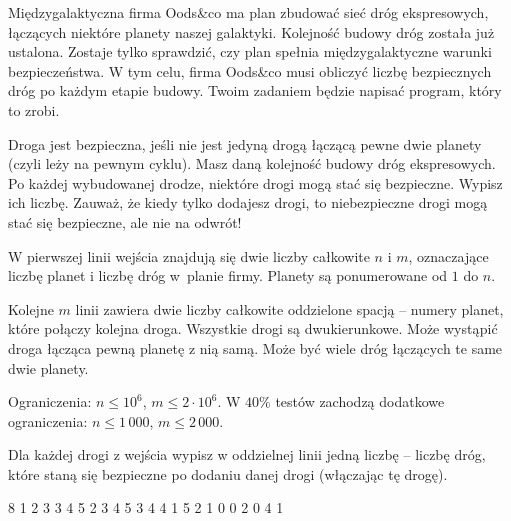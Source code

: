 

\usepackage[utf8]{inputenc}
\usepackage[T1]{fontenc}
\usepackage[polish]{babel}
\usepackage{polski}





Międzygalaktyczna firma Oods\&co ma plan zbudować sieć dróg ekspresowych,
	łączących niektóre planety naszej galaktyki.
Kolejność budowy dróg została już ustalona.
Zostaje tylko sprawdzić, czy plan spełnia międzygalaktyczne warunki bezpieczeństwa.
W tym celu, firma Oods\&co musi obliczyć liczbę bezpiecznych dróg po każdym etapie budowy.
Twoim zadaniem będzie napisać program, który to zrobi.


Droga jest bezpieczna, jeśli nie jest jedyną drogą łączącą pewne dwie planety (czyli leży na pewnym cyklu).
Masz daną kolejność budowy dróg ekspresowych.
Po każdej wybudowanej drodze, niektóre drogi mogą stać się bezpieczne.
Wypisz ich liczbę.
Zauważ, że kiedy tylko dodajesz drogi, to niebezpieczne drogi mogą stać się bezpieczne, ale nie na odwrót!


W pierwszej linii wejścia znajdują się dwie liczby całkowite $n$ i $m$,
	oznaczające liczbę planet i liczbę dróg w~planie firmy.
Planety są ponumerowane od $1$ do $n$.

Kolejne $m$ linii zawiera dwie liczby całkowite oddzielone spacją
	-- numery planet, które połączy kolejna droga.
Wszystkie drogi są dwukierunkowe.
Może wystąpić droga łącząca pewną planetę z nią samą.
Może być wiele dróg łączących te same dwie planety.

Ograniczenia: $n \le 10^6$, $m \le 2 \cdot 10^6$.
W $40\%$ testów zachodzą dodatkowe ograniczenia: $n \le 1\,000$, $m \le 2\,000$.


Dla każdej drogi z wejścia wypisz w oddzielnej linii jedną liczbę
	-- liczbę dróg, które staną się bezpieczne po dodaniu danej drogi (włączając tę drogę).



 8
1 2
3 3
4 5
2 3
4 5
3 4
4 1
5 2
1
0
0
2
0
4
1
\sampleEND



